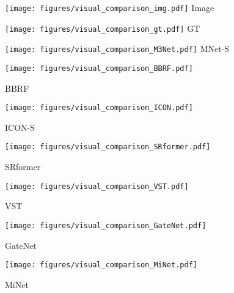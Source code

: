 \documentclass[lettersize,journal]{IEEEtran}
\begin{document}
\begin{figure*}
	\centering \begin{minipage}[t]{0.09\textwidth}
		\centering
		\texttt{[image: figures/visual\_comparison\_img.pdf]}
		\centering\footnotesize{Image}
	\end{minipage}
	\begin{minipage}[t]{0.09\textwidth}
		\centering
		\texttt{[image: figures/visual\_comparison\_gt.pdf]}
		\centering\footnotesize{GT}
	\end{minipage}
	\begin{minipage}[t]{0.09\textwidth}
		\centering
		\texttt{[image: figures/visual\_comparison\_M3Net.pdf]}
		\centering\footnotesize{MNet-S}
	\end{minipage}
	\begin{minipage}[t]{0.09\textwidth}
		\centering
		\texttt{[image: figures/visual\_comparison\_BBRF.pdf]}
		\centering\footnotesize{BBRF\par\cite{BBRF}}
	\end{minipage}
	\begin{minipage}[t]{0.09\textwidth}
		\centering
		\texttt{[image: figures/visual\_comparison\_ICON.pdf]}
		\centering\footnotesize{ICON-S\par\cite{ICON}}
	\end{minipage}
	\begin{minipage}[t]{0.09\textwidth}
		\centering
		\texttt{[image: figures/visual\_comparison\_SRformer.pdf]}
		\centering\footnotesize{SRformer\par\cite{SelfReformer}}
	\end{minipage}
	\begin{minipage}[t]{0.09\textwidth}
		\centering
		\texttt{[image: figures/visual\_comparison\_VST.pdf]}
		\centering\footnotesize{VST\par\cite{VST}}
	\end{minipage}
	\begin{minipage}[t]{0.09\textwidth}
		\centering
		\texttt{[image: figures/visual\_comparison\_GateNet.pdf]}
		\centering\footnotesize{GateNet\par\cite{GateNet}}
	\end{minipage}
	\begin{minipage}[t]{0.09\textwidth}
		\centering
		\texttt{[image: figures/visual\_comparison\_MiNet.pdf]}
		\centering\footnotesize{MiNet\par\cite{MiNet}}
	\end{minipage}

\end{figure*}
\end{document}
